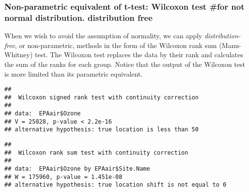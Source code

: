 \documentclass[]{article}
\newenvironment{Shaded}{\begin{snugshade}}{\end{snugshade}}
\newcommand{\KeywordTok}[1]{\textcolor[rgb]{0.13,0.29,0.53}{\textbf{#1}}}
\newcommand{\DataTypeTok}[1]{\textcolor[rgb]{0.13,0.29,0.53}{#1}}
\newcommand{\DecValTok}[1]{\textcolor[rgb]{0.00,0.00,0.81}{#1}}
\newcommand{\StringTok}[1]{\textcolor[rgb]{0.31,0.60,0.02}{#1}}
\newcommand{\CommentTok}[1]{\textcolor[rgb]{0.56,0.35,0.01}{\textit{#1}}}
\newcommand{\OperatorTok}[1]{\textcolor[rgb]{0.81,0.36,0.00}{\textbf{#1}}}
\newcommand{\NormalTok}[1]{#1}
\begin{document}
\subsubsection{Non-parametric equivalent of t-test: Wilcoxon test \#for
not normal distribution. distribution
free}\label{non-parametric-equivalent-of-t-test-wilcoxon-test-for-not-normal-distribution.-distribution-free}

When we wish to avoid the assumption of normality, we can apply
\emph{distribution-free}, or non-parametric, methods in the form of the
Wilcoxon rank sum (Mann-Whitney) test. The Wilcoxon test replaces the
data by their rank and calculates the sum of the ranks for each group.
Notice that the output of the Wilcoxon test is more limited than its
parametric equivalent.

\begin{Shaded}
\end{Shaded}

\begin{verbatim}
## 
##  Wilcoxon signed rank test with continuity correction
## 
## data:  EPAair$Ozone
## V = 25828, p-value < 2.2e-16
## alternative hypothesis: true location is less than 50
\end{verbatim}

\begin{Shaded}
\end{Shaded}

\begin{verbatim}
## 
##  Wilcoxon rank sum test with continuity correction
## 
## data:  EPAair$Ozone by EPAair$Site.Name
## W = 175960, p-value = 1.451e-08
## alternative hypothesis: true location shift is not equal to 0
\end{verbatim}
\end{document}
